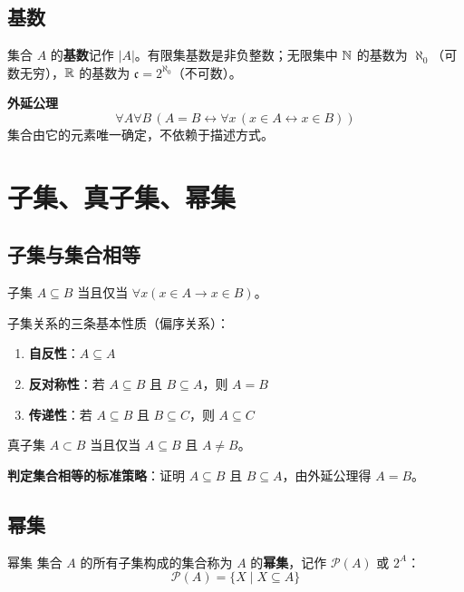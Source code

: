 \subsection{基数}

集合 $A$ 的\textbf{基数}记作 $|A|$。有限集基数是非负整数；无限集中 $\mathbb{N}$ 的基数为 $\aleph_0$（可数无穷），$\mathbb{R}$ 的基数为 $\mathfrak{c} = 2^{\aleph_0}$（不可数）。

\begin{myformula}
\textbf{外延公理}
\[
\forall A \forall B \, (A = B \leftrightarrow \forall x \, (x \in A \leftrightarrow x \in B))
\]
集合由它的元素唯一确定，不依赖于描述方式。
\end{myformula}

\section{子集、真子集、幂集}

\subsection{子集与集合相等}

\begin{mydefinition}{子集}
$A \subseteq B$ 当且仅当 $\forall x (x \in A \rightarrow x \in B)$。
\end{mydefinition}

子集关系的三条基本性质（偏序关系）：
\begin{enumerate}
\item \textbf{自反性}：$A \subseteq A$
\item \textbf{反对称性}：若 $A \subseteq B$ 且 $B \subseteq A$，则 $A = B$
\item \textbf{传递性}：若 $A \subseteq B$ 且 $B \subseteq C$，则 $A \subseteq C$
\end{enumerate}

\begin{mydefinition}{真子集}
$A \subset B$ 当且仅当 $A \subseteq B$ 且 $A \neq B$。
\end{mydefinition}

\textbf{判定集合相等的标准策略}：证明 $A \subseteq B$ 且 $B \subseteq A$，由外延公理得 $A = B$。

\subsection{幂集}

\begin{mydefinition}{幂集}
集合 $A$ 的所有子集构成的集合称为 $A$ 的\textbf{幂集}，记作 $\mathcal{P}(A)$ 或 $2^A$：
\[\mathcal{P}(A) = \{X \mid X \subseteq A\}\]
\end{mydefinition}

